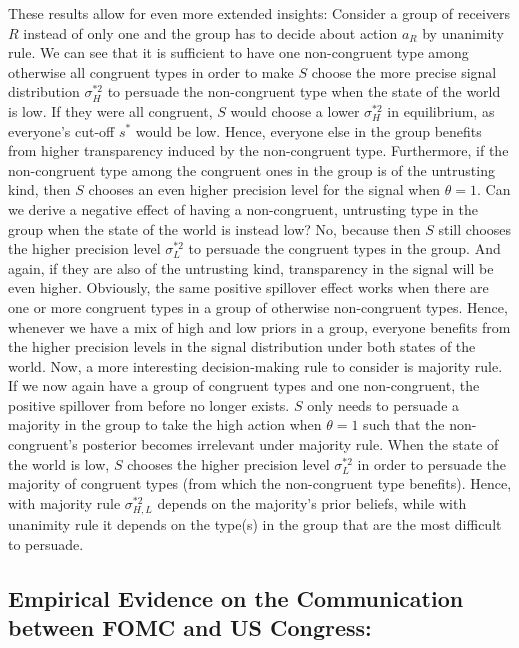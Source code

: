 \documentclass[paper=a4,12pt,DIV=11,twoside=false]{scrartcl}
\begin{document}
\noindent These results allow for even more extended insights: Consider a group of receivers $R$ instead of only one and the group has to decide about action $a_R$ by unanimity rule. We can see that it is sufficient to have one non-congruent type among otherwise all congruent types in order to make $S$ choose the more precise signal distribution $\sigma^{*2}_H$ to persuade the non-congruent type when the state of the world is low. If they were all congruent, $S$ would choose a lower $\sigma^{*2}_H$ in equilibrium, as everyone's cut-off $s^{*}$ would be low. Hence, everyone else in the group benefits from higher transparency induced by the non-congruent type. Furthermore, if the non-congruent type among the congruent ones in the group is of the untrusting kind, then $S$ chooses an even higher precision level for the signal when $\theta = 1$. Can we derive a negative effect of having a non-congruent, untrusting type in the group when the state of the world is instead low? No, because then $S$ still chooses the higher precision level $\sigma^{*2}_L$ to persuade the congruent types in the group. And again, if they are also of the untrusting kind, transparency in the signal will be even higher. Obviously, the same positive spillover effect works when there are one or more congruent types in a group of otherwise non-congruent types. Hence, whenever we have a mix of high and low priors in a group, everyone benefits from the higher precision levels in the signal distribution under both states of the world. Now, a more interesting decision-making rule to consider is majority rule. If we now again have a group of congruent types and one non-congruent, the positive spillover from before no longer exists. $S$ only needs to persuade a majority in the group to take the high action when $\theta = 1$ such that the non-congruent's posterior becomes irrelevant under majority rule. When the state of the world is low, $S$ chooses the higher precision level $\sigma^{*2}_L$ in order to persuade the majority of congruent types (from which the non-congruent type benefits). Hence, with majority rule $\sigma^{*2}_{H,L}$ depends on the majority's prior beliefs, while with unanimity rule it depends on the type(s) in the group that are the most difficult to persuade. 

\subsection{Empirical Evidence on the Communication between FOMC and US Congress:}
\end{document}
